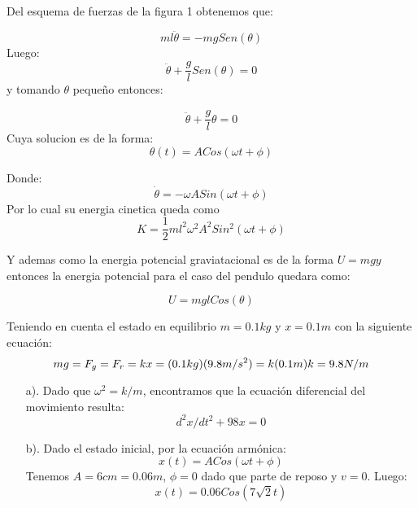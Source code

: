\documentclass[a4paper]{article}
\begin{document}
\begin{answer}[Problema 5.]

    Del esquema de fuerzas de la figura 1 obtenemos que:


    \begin{equation*}
        ml\ddot{\theta} = -mgSen(\theta)
    \end{equation*}
    Luego:
    \begin{equation*}
        \ddot{\theta} + \frac{g}{l}Sen(\theta) = 0
    \end{equation*}
    y tomando $\theta$ pequeño  entonces:

    \begin{equation*}
        \ddot{\theta} + \frac{g}{l}\theta = 0
    \end{equation*}
    Cuya solucion es de la forma:
    \begin{equation*}
        \theta(t) = ACos(\omega t + \phi)
    \end{equation*}

    Donde:
    \begin{equation*}
        \dot{\theta} = -\omega ASin(\omega t + \phi)
    \end{equation*}
    Por lo cual su energia cinetica queda como
    $$K = \frac{1}{2}ml^2\omega^2 A^2 Sin^2(\omega t+\phi )  $$

    Y ademas como la energia potencial graviatacional es de la forma $U = mgy$
    entonces la energia potencial para el caso del pendulo quedara como:

    \begin{equation*}
        U = mglCos(\theta)
    \end{equation*}
\end{answer}

\begin{answer}[Problema 6.]
    Teniendo en cuenta el estado en equilibrio $m = 0.1 kg$ y $x = 0.1m$ con la siguiente ecuación:
    \begin{equation}
        mg = F_g = F_r = kx =\\
        (0.1 kg)(9.8 m/s^2) = k (0.1m)\\
        k = 9.8 N/m
    \end{equation}
    \begin{enumerate}
        \item [a).] Dado que $\omega^2 = k/m$, encontramos que la ecuación diferencial del movimiento resulta:
              $$d^2x/dt^2 + 98 x = 0$$
        \item [b).] Dado el estado inicial, por la ecuación armónica:
              $$x(t) = ACos(\omega t + \phi)$$
              Tenemos $A = 6cm = 0.06 m$, $\phi = 0$ dado que parte de reposo y $v = 0$. Luego:
              $$ x(t) = 0.06 Cos(7 \sqrt{2} t)$$

    \end{enumerate}
\end{answer}
\end{document}
